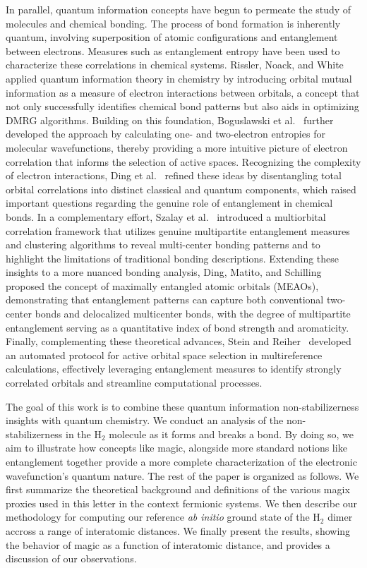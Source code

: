 \documentclass[aps, prl, twocolumn, groupedaddress, reprint, floatfix, nofootinbib, longbibliography]{revtex4-2}
\begin{document}
    In parallel, quantum information concepts have begun to permeate the study of molecules and chemical bonding. The process of bond formation is inherently quantum, involving superposition of atomic configurations and entanglement between electrons. Measures such as entanglement entropy have been used to characterize these correlations in chemical systems. Rissler, Noack, and White \cite{rissler2006measuring} applied quantum information theory in chemistry by introducing orbital mutual information as a measure of electron interactions between orbitals, a concept that not only successfully identifies chemical bond patterns but also aids in optimizing DMRG algorithms. Building on this foundation, Boguslawski et al. \cite{boguslawski2015orbital} further developed the approach by calculating one- and two-electron entropies for molecular wavefunctions, thereby providing a more intuitive picture of electron correlation that informs the selection of active spaces. Recognizing the complexity of electron interactions, Ding et al. \cite{ding2020concept} refined these ideas by disentangling total orbital correlations into distinct classical and quantum components, which raised important questions regarding the genuine role of entanglement in chemical bonds. In a complementary effort, Szalay et al. \cite{szalay2017correlation} introduced a multiorbital correlation framework that utilizes genuine multipartite entanglement measures and clustering algorithms to reveal multi-center bonding patterns and to highlight the limitations of traditional bonding descriptions. Extending these insights to a more nuanced bonding analysis, Ding, Matito, and Schilling \cite{ding2025entanglement} proposed the concept of maximally entangled atomic orbitals (MEAOs), demonstrating that entanglement patterns can capture both conventional two-center bonds and delocalized multicenter bonds, with the degree of multipartite entanglement serving as a quantitative index of bond strength and aromaticity. Finally, complementing these theoretical advances, Stein and Reiher \cite{stein2016automated} developed an automated protocol for active orbital space selection in multireference calculations, effectively leveraging entanglement measures to identify strongly correlated orbitals and streamline computational processes.

    The goal of this work is to combine these quantum information non-stabilizerness insights with quantum chemistry. We conduct an analysis of the non-stabilizerness in the H$_2$ molecule as it forms and breaks a bond. By doing so, we aim to illustrate how concepts like magic, alongside more standard notions like entanglement together provide a more complete characterization of the electronic wavefunction’s quantum nature. The rest of the paper is organized as follows. We first summarize the theoretical background and definitions of the various magix proxies used in this letter in the context fermionic systems. We then describe our methodology for computing our reference \textit{ab initio} ground state of the H$_2$ dimer accross a range of interatomic distances. We finally present the results, showing the behavior of magic as a function of interatomic distance, and provides a discussion of our observations.
\end{document}
